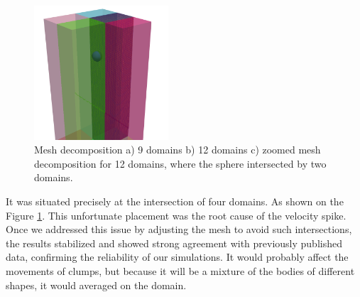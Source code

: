 \begin{figure}[!htp]
\begin{minipage}{7cm}
\subcaption{}
\end{minipage}
\newline
\begin{minipage}{7cm}
\includegraphics[width=5cm]{GWU_Thesis_Sarmakeeva/Images/chap3/decomp12_zoom.png}
\subcaption{}
\end{minipage}
\caption{Mesh decomposition a) 9 domains b) 12 domains c) zoomed mesh decomposition for 12 domains, where the sphere intersected by two domains.}
\label{decompositopn}
\end{figure}

It was situated precisely at the intersection of four domains. As shown on the Figure \ref{decompositopn}. This unfortunate placement was the root cause of the velocity spike. Once we addressed this issue by adjusting the mesh to avoid such intersections, the results stabilized and showed strong agreement with previously published data, confirming the reliability of our simulations. It would probably affect the movements of clumps, but because it will be a mixture of the bodies of different shapes, it would averaged on the domain.





